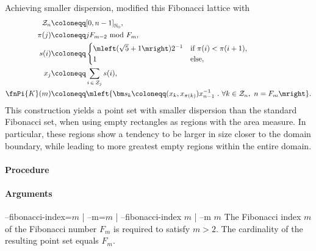 
Achieving smaller dispersion,  modified this Fibonacci lattice with
\begin{align*}
  \mathcal Z_n &\coloneqq [0, n-1]_{\mathbb N_0}, \\
  \pi(j) &\coloneqq j F_{m-2}\ \text{mod}\ F_m, \\
  s(i) &\coloneqq \begin{cases}
    \mleft(\sqrt{5}+1\mright)2^{-1} & \text{if}\ \pi(i) < \pi(i+1), \\
    1 & \text{else},
  \end{cases} \\
  x_j &\coloneqq \sum_{i\,\in\,\mathcal Z_j} s(i), \\
  \fnPi{K}(m) &\coloneqq \mleft\{ \bm s_k \coloneqq (x_k, x_{\pi(k)}) x_{n-1}^{-1}\ .\ \forall k \in \mathcal Z_n,\ n = F_m \mright\}.
\end{align*}
This construction yields a point set with smaller dispersion than the standard Fibonacci set, when using empty rectangles as regions with the area measure. In particular, these regions show a tendency to be larger in size closer to the domain boundary, while leading to more greatest empty regions within the entire domain.


\paragraph{Procedure}

\begin{synopsis}
\end{synopsis}

\paragraph{Arguments}

\begin{procarg}{--fibonacci-index=$m$ | --m=$m$ | --fibonacci-index $m$ | --m $m$}
  The Fibonacci index $m$ of the Fibonacci number $F_m$ is required to satisfy $m > 2$. The cardinality of the resulting point set equals $F_m$.
\end{procarg}

